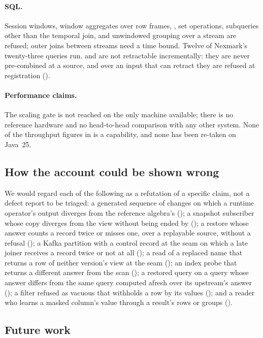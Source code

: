 \documentclass[11pt,a4paper]{article}
\renewcommand{\_}{\oldunderscore\allowbreak}
\newcommand{\code}[1]{\texttt{\pvbreakable{#1}}}
\begin{document}
\paragraph{SQL.} Session windows, window aggregates over row frames, \code{ORDER BY}, set operations,
subqueries other than the temporal join, and unwindowed grouping over a stream are refused; outer joins
between streams need a time bound. Twelve of Nexmark's twenty-three queries run. \code{MIN} and
\code{MAX} are not retractable incrementally: they are never pre-combined at a source, and over an input
that can retract they are refused at registration (\code{PRV-2076}).

\paragraph{Performance claims.} The scaling gate is not reached on the only machine available; there is
no reference hardware and no head-to-head comparison with any other system. None of the throughput
figures in  is a capability, and none has been re-taken on Java~25.

\subsection{How the account could be shown wrong}

We would regard each of the following as a refutation of a specific claim, not a defect report to be
triaged: a generated sequence of changes on which a runtime operator's output diverges from the
reference algebra's (); a snapshot subscriber whose copy diverges from the view without
being ended by \code{PRV-6105} (); a restore whose answer counts a record twice or
misses one, over a replayable source, without a refusal (); a Kafka partition with a
control record at the seam on which a late joiner receives a record twice or not at all
(); a read of a replaced name that returns a row of neither version's view at the seam
(); an index probe that returns a different answer from the scan
(); a restored query on a query whose answer differs from the same
query computed afresh over its upstream's answer (); a filter refused as vacuous that
withholds a row by its values (); and a reader who learns a masked column's value
through a result's rows or groups ().

\subsection{Future work}
\end{document}
